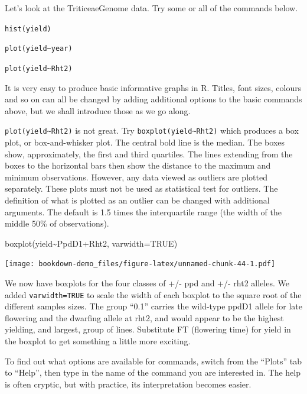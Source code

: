 \documentclass[
]{book}
\newenvironment{Shaded}{\begin{snugshade}}{\end{snugshade}}
\newcommand{\AttributeTok}[1]{\textcolor[rgb]{0.77,0.63,0.00}{#1}}
\newcommand{\ConstantTok}[1]{\textcolor[rgb]{0.00,0.00,0.00}{#1}}
\newcommand{\FunctionTok}[1]{\textcolor[rgb]{0.00,0.00,0.00}{#1}}
\newcommand{\NormalTok}[1]{#1}
\newcommand{\SpecialCharTok}[1]{\textcolor[rgb]{0.00,0.00,0.00}{#1}}
\begin{document}
Let's look at the TriticeaeGenome data. Try some or all of the commands below.

\texttt{hist(yield)}

\texttt{plot(yield\textasciitilde{}year)}

\texttt{plot(yield\textasciitilde{}Rht2)}

It is very easy to produce basic informative graphs in R. Titles, font sizes, colours and so on can all be changed by adding additional options to the basic commands above, but we shall introduce those as we go along.

\texttt{plot(yield\textasciitilde{}Rht2)} is not great. Try \texttt{boxplot(yield\textasciitilde{}Rht2)} which produces a box plot, or box-and-whisker plot. The central bold line is the median. The boxes show, approximately, the first and third quartiles. The lines extending from the boxes to the horizontal bars then show the distance to the maximum and minimum observations. However, any data viewed as outliers are plotted separately. These plots must not be used as statistical test for outliers. The definition of what is plotted as an outlier can be changed with additional arguments. The default is 1.5 times the interquartile range (the width of the middle 50\% of observations).

\begin{Shaded}
\begin{Highlighting}[]
\FunctionTok{boxplot}\NormalTok{(yield}\SpecialCharTok{\textasciitilde{}}\NormalTok{PpdD1}\SpecialCharTok{+}\NormalTok{Rht2, }\AttributeTok{varwidth=}\ConstantTok{TRUE}\NormalTok{)}
\end{Highlighting}
\end{Shaded}

\texttt{[image: bookdown-demo\_files/figure-latex/unnamed-chunk-44-1.pdf]}

We now have boxplots for the four classes of +/- ppd and +/- rht2 alleles. We added \texttt{varwidth=TRUE} to scale the width of each boxplot to the square root of the different samples sizes. The group ``0.1'' carries the wild-type ppdD1 allele for late flowering and the dwarfing allele at rht2, and would appear to be the highest yielding, and largest, group of lines. Substitute FT (flowering time) for yield in the boxplot to get something a little more exciting.

To find out what options are available for commands, switch from the ``Plots'' tab to ``Help'', then type in the name of the command you are interested in. The help is often cryptic, but with practice, its interpretation becomes easier.
\end{document}
